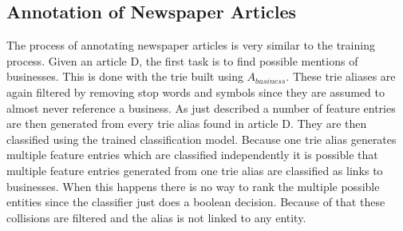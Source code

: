 \subsection{Annotation of Newspaper Articles}
The process of annotating newspaper articles is very similar to the training process. Given an article D, the first task is to find possible mentions of businesses. This is done with the trie built using $A_{business}$. These trie aliases are again filtered by removing stop words and symbols since they are assumed to almost never reference a business. As just described a number of feature entries are then generated from every trie alias found in article D. They are then classified using the trained classification model. Because one trie alias generates multiple feature entries which are classified independently it is possible that multiple feature entries generated from one trie alias are classified as links to businesses. When this happens there is no way to rank the multiple possible entities since the classifier just does a boolean decision. Because of that these collisions are filtered and the alias is not linked to any entity. %
